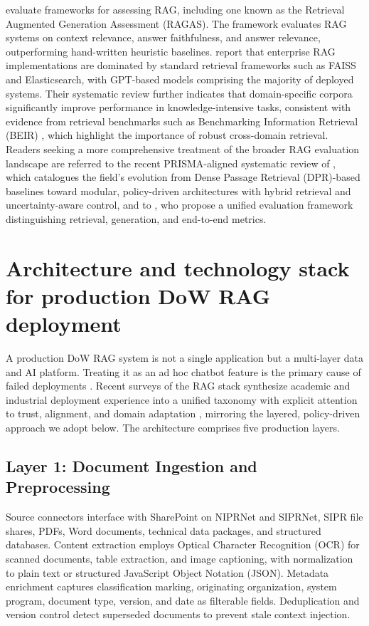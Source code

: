 \documentclass[12pt,letterpaper]{article}
\let\cite\parencite
\begin{document}
\textcite{ares2024} evaluate frameworks for assessing RAG, including one known as the Retrieval Augmented Generation Assessment (RAGAS). The framework evaluates RAG systems on context relevance, answer faithfulness, and answer relevance, outperforming hand-written heuristic baselines. \textcite{mdpi2025} report that enterprise RAG implementations are dominated by standard retrieval frameworks such as FAISS and Elasticsearch, with GPT-based models comprising the majority of deployed systems. Their systematic review further indicates that domain-specific corpora significantly improve performance in knowledge-intensive tasks, consistent with evidence from retrieval benchmarks such as Benchmarking Information Retrieval (BEIR) \cite{thakur2021}, which highlight the importance of robust cross-domain retrieval. Readers seeking a more comprehensive treatment of the broader RAG evaluation landscape are referred to the recent PRISMA-aligned systematic review of \textcite{brown2025}, which catalogues the field's evolution from Dense Passage Retrieval (DPR)-based baselines toward modular, policy-driven architectures with hybrid retrieval and uncertainty-aware control, and to \textcite{yu2025rag}, who propose a unified evaluation framework distinguishing retrieval, generation, and end-to-end metrics.

\section{Architecture and technology stack for production DoW RAG deployment}

A production DoW RAG system is not a single application but a multi-layer data and AI platform. Treating it as an ad hoc chatbot feature is the primary cause of failed deployments \cite{devcommunity2025}. Recent surveys of the RAG stack synthesize academic and industrial deployment experience into a unified taxonomy with explicit attention to trust, alignment, and domain adaptation \cite{wampler2026}, mirroring the layered, policy-driven approach we adopt below. The architecture comprises five production layers.

\subsection{Layer 1: Document Ingestion and Preprocessing}

Source connectors interface with SharePoint on NIPRNet and SIPRNet, SIPR file shares, PDFs, Word documents, technical data packages, and structured databases. Content extraction employs Optical Character Recognition (OCR) for scanned documents, table extraction, and image captioning, with normalization to plain text or structured JavaScript Object Notation (JSON). Metadata enrichment captures classification marking, originating organization, system program, document type, version, and date as filterable fields. Deduplication and version control detect superseded documents to prevent stale context injection.
\end{document}
